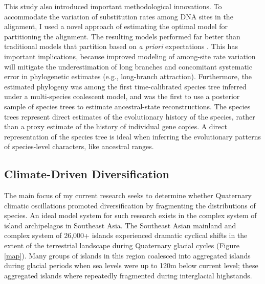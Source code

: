 \documentclass[10pt]{article}
\begin{document}
This study also introduced important methodological innovations.
To accommodate the variation of substitution rates among DNA sites in the alignment, I used a novel approach of estimating the optimal model for partitioning the alignment.
The resulting models performed far better than traditional models that partition based on \emph{a priori} expectations .
This has important implications, because improved modeling of among-site rate variation will mitigate the underestimation of long branches and concomitant systematic error in phylogenetic estimates (e.g., long-branch attraction).
Furthermore, the estimated phylogeny was among the first time-calibrated species tree inferred under a multi-species coalescent model, and was the first to use a posterior sample of species trees to estimate ancestral-state reconstructions.
The species trees represent direct estimates of the evolutionary history of the species, rather than a proxy estimate of the history of individual gene copies.
A direct representation of the species tree is ideal when inferring the evolutionary patterns of species-level characters, like ancestral ranges.

\subsection*{Climate-Driven Diversification}
The main focus of my current research seeks to determine whether Quaternary climatic oscillations promoted diversification by fragmenting the distributions of species.
An ideal model system for such research exists in the complex system of island archipelagos in Southeast Asia.
The Southeast Asian mainland and complex system of 26,000+ islands experienced dramatic cyclical shifts in the extent of the terrestrial landscape during Quaternary glacial cycles (Figure \ref{map}).
Many groups of islands in this region coalesced into aggregated islands during glacial periods when sea levels were up to 120m below current level; these aggregated islands where repeatedly fragmented during interglacial highstands.
\end{document}
